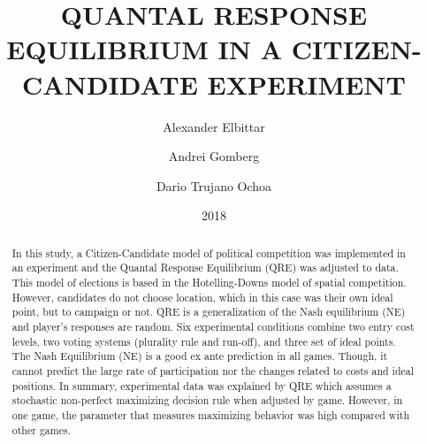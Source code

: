 \documentclass[12pts]{article}
\title{QUANTAL RESPONSE EQUILIBRIUM IN A CITIZEN-CANDIDATE EXPERIMENT}
\author{Alexander Elbittar \and Andrei Gomberg \and Dario Trujano Ochoa}
\date{2018}
\begin{document}
\maketitle

\begin{abstract}

In this study, a Citizen-Candidate model of political competition was implemented in an experiment and the Quantal Response Equilibrium (QRE) was adjusted to data. 
This model of elections is based in the Hotelling-Downs model of spatial competition. 
However, candidates do not choose location, which in this case was their own ideal point, but to campaign or not. QRE is a generalization of the Nash equilibrium (NE) and player's responses are random. Six experimental conditions combine two entry cost levels, 
two voting systems (plurality rule and run-off), and three set of ideal points. 
The Nash Equilibrium (NE) is a good ex ante prediction in all games. 
Though, it cannot predict the large rate of participation nor the changes related to costs and ideal positions.  
In summary,  experimental  data  was explained  by QRE which assumes  a  stochastic  non-perfect  maximizing  decision rule when adjusted by game. However, in one game, the parameter that measures maximizing behavior was high compared with other games.


\end{abstract}











 


\end{document}
